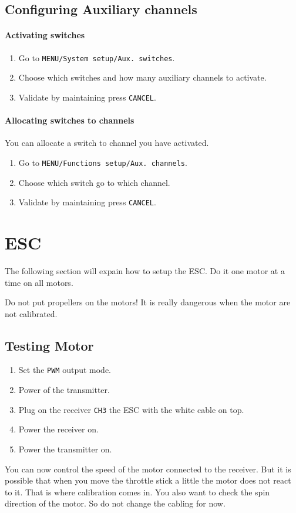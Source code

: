 \subsection{Configuring Auxiliary channels}
\paragraph{Activating switches}
\begin{enumerate}
    \item Go to \texttt{MENU/System setup/Aux. switches}.
    \item Choose which switches and how many auxiliary channels to activate.
    \item Validate by maintaining press \texttt{CANCEL}.
\end{enumerate}

\paragraph{Allocating switches to channels}
You can allocate a switch to channel you have activated.
\begin{enumerate}
    \item Go to \texttt{MENU/Functions setup/Aux. channels}.
    \item Choose which switch go to which channel.
    \item Validate by maintaining press \texttt{CANCEL}.
\end{enumerate}

\section{ESC}
The following section will expain how to setup the ESC.
Do it one motor at a time on all motors.

Do not put propellers on the motors! It is really dangerous when the motor are not calibrated.
\subsection{Testing Motor}

\begin{enumerate}
    \item Set the \texttt{PWM} output mode.
    \item Power of the transmitter.
    \item Plug on the receiver \texttt{CH3} the ESC with the white cable on top.
    \item Power the receiver on.
    \item Power the transmitter on.
\end{enumerate}
You can now control the speed of the motor connected to the receiver. But it is possible that when you move the throttle stick a little the motor does not react to it. That is where calibration comes in. You also want to check the spin direction of the motor. So do not change the cabling for now.


